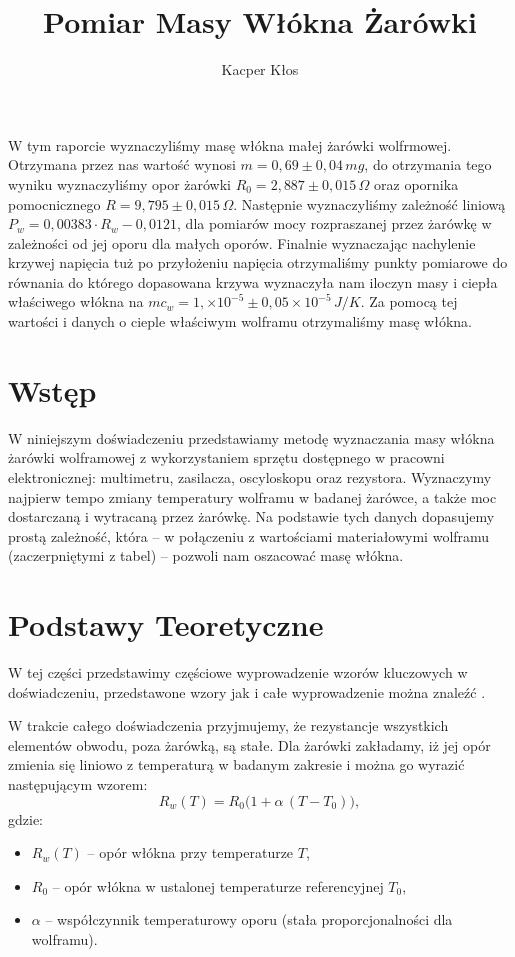 \documentclass[12pt]{article}
\title{Pomiar Masy Włókna Żarówki}
\author{Kacper Kłos}
\begin{document}
\maketitle
W tym raporcie wyznaczyliśmy masę włókna małej żarówki wolfrmowej. Otrzymana przez nas wartość wynosi $m = 0{,}69 \pm 0{,}04 \, mg$, do otrzymania tego wyniku wyznaczyliśmy opor żarówki $R_0 = 2{,}887 \pm 0{,}015 \, \Omega$ oraz opornika pomocnicznego $R = 9{,}795 \pm 0{,}015 \, \Omega$. Następnie wyznaczyliśmy zależność liniową $P_w = 0{,}00383 \cdot R_w - 0{,}0121$, dla pomiarów mocy rozpraszanej przez żarówkę w zależności od jej oporu dla małych oporów. Finalnie wyznaczając nachylenie krzywej napięcia tuż po przyłożeniu napięcia otrzymaliśmy punkty pomiarowe do równania do którego dopasowana krzywa wyznaczyła nam iloczyn masy i ciepła właściwego włókna na $mc_w=1{,} \times 10^{-5} \pm 0{,}05 \times 10^{-5} \, J/K$. Za pomocą tej wartości i danych o cieple właściwym wolframu otrzymaliśmy masę włókna.
\newpage

\section{Wstęp}
W niniejszym doświadczeniu przedstawiamy metodę wyznaczania masy włókna żarówki wolframowej z wykorzystaniem sprzętu dostępnego w pracowni elektronicznej: multimetru, zasilacza, oscyloskopu oraz rezystora.  
Wyznaczymy najpierw tempo zmiany temperatury wolframu w badanej żarówce, a także moc dostarczaną i wytracaną przez żarówkę.  
Na podstawie tych danych dopasujemy prostą zależność, która – w połączeniu z wartościami materiałowymi wolframu (zaczerpniętymi z tabel) – pozwoli nam oszacować masę włókna.

\section{Podstawy Teoretyczne}
W tej części przedstawimy częściowe wyprowadzenie wzorów kluczowych w doświadczeniu, przedstawone wzory jak i całe wyprowadzenie można znaleźć \cite{skrypt}.

W trakcie całego doświadczenia przyjmujemy, że rezystancje wszystkich elementów obwodu, poza żarówką, są stałe.  
Dla żarówki zakładamy, iż jej opór zmienia się liniowo z temperaturą w badanym zakresie i można go wyrazić następującym wzorem:
\begin{equation}
    R_w(T) = R_0 \bigl(1+\alpha\,(T - T_0)\bigr),
    \label{eq:resistance}
\end{equation}
gdzie:
\begin{itemize}
\item $R_w(T)$ – opór włókna przy temperaturze $T$,  
\item $R_0$ – opór włókna w ustalonej temperaturze referencyjnej $T_0$,  
\item $\alpha$ – współczynnik temperaturowy oporu (stała proporcjonalności dla wolframu).
\end{itemize}
\end{document}
